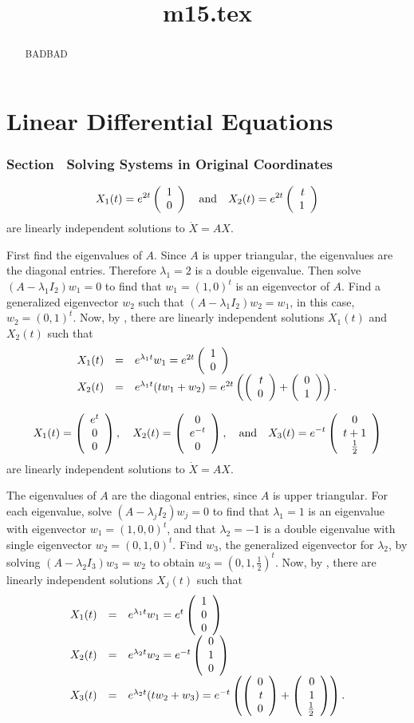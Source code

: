 \documentclass{ximera}
\title{m15.tex}
\begin{document}
\begin{abstract}
BADBAD
\end{abstract}
\maketitle

\chapter{Linear Differential Equations}


\subsection*{Section~\protect{\ref{S:SEOC}} Solving Systems in Original Coordinates}


 \ans
\[
X_1(t) = e^{2t}\left(\begin{array}{r} 1 \\ 0\end{array}\right) \quad\mbox{and}\quad
X_2(t) = e^{2t}\left(\begin{array}{r} t \\ 1\end{array}\right)
\]
are linearly independent solutions to $\dot{X} = AX$.

\soln First find the eigenvalues of $A$.  Since $A$ is upper triangular,
the eigenvalues are the diagonal entries.  Therefore $\lambda_1 = 2$
is a double eigenvalue.  Then solve $(A - \lambda_1 I_2)w_1 = 0$ to
find that $w_1 = (1,0)^t$ is an eigenvector of $A$.  Find a
generalized eigenvector $w_2$ such that $(A - \lambda_1 I_2)w_2 =
w_1$, in this case, $w_2 = (0,1)^t$.  Now, by ,
there are linearly independent solutions $X_1(t)$ and $X_2(t)$ such that
\[
\begin{array}{rcl}
X_1(t) & = & e^{\lambda_1 t}w_1 = e^{2t}\left(\begin{array}{r} 1 \\ 0\end{array}\right) \\ X_2(t) & = &
e^{\lambda_1 t}(tw_1 + w_2) = e^{2t}\left(\left(\begin{array}{r} t \\ 0\end{array}\right) +
\left(\begin{array}{r} 0 \\ 1\end{array}\right)\right).
\end{array}
\]

 \ans
\[
X_1(t) = \left(\begin{array}{c} e^t \\ 0 \\ 0\end{array}\right), \quad
X_2(t) = \left(\begin{array}{c} 0 \\ e^{-t} \\ 0\end{array}\right), \quad\mbox{and}\quad
X_3(t) = e^{-t}\left(\begin{array}{c} 0 \\ t + 1 \\ \frac{1}{2}\end{array}\right)
\]
are linearly independent solutions to $\dot{X} = AX$.

\soln The eigenvalues of $A$ are the diagonal entries, since $A$ is upper
triangular.  For each eigenvalue, solve $(A - \lambda_j I_2)w_j = 0$
to find that $\lambda_1 = 1$ is an eigenvalue with eigenvector $w_1 =
(1,0,0)^t$, and that $\lambda_2 = -1$ is a double eigenvalue with
single eigenvector $w_2 = (0,1,0)^t$.  Find $w_3$, the generalized
eigenvector for $\lambda_2$, by solving $(A - \lambda_2 I_3)w_3 = w_2$
to obtain $w_3 = (0,1,\frac{1}{2})^t$.  Now, by ,
there are linearly independent solutions $X_j(t)$ such that
\[
\begin{array}{rcl}
X_1(t) & = & e^{\lambda_1 t}w_1 = e^t\left(\begin{array}{r} 1 \\ 0 \\ 0\end{array}\right) \\
X_2(t) & = & e^{\lambda_2 t}w_2 = e^{-t}\left(\begin{array}{r} 0 \\ 1 \\ 0\end{array}\right) \\
X_3(t) & = & e^{\lambda_2 t}(tw_2 + w_3) = e^{-t}\left(\left(\begin{array}{r} 0 \\ t \\ 0\end{array}\right)
+ \left(\begin{array}{r} 0 \\ 1 \\ \frac{1}{2}\end{array}\right)\right).
\end{array}
\]
\end{document}
